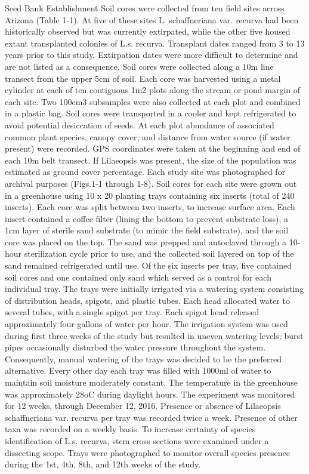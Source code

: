 \documentclass[multicol]{elsarticle}
\begin{document}
\begin{multicols}{2}
\begin{subsection}{Seed Bank Establishment}
Soil cores were collected from ten field sites across Arizona (Table 1-1). At five of these sites L. schaffneriana var. recurva had been historically observed but was currently extirpated, while the other five housed extant transplanted colonies of L.s. recurva. Transplant dates ranged from 3 to 13 years prior to this study. Extirpation dates were more difficult to determine and are not listed as a consequence. Soil cores were collected along a 10m line transect from the upper 5cm of soil. Each core was harvested using a metal cylinder at each of ten contiguous 1m2 plots along the stream or pond margin of each site. Two 100cm3 subsamples were also collected at each plot and combined in a plastic bag. Soil cores were transported in a cooler and kept refrigerated to avoid potential desiccation of seeds. At each plot abundance of associated common plant species, canopy cover, and distance from water source (if water present) were recorded. GPS coordinates were taken at the beginning and end of each 10m belt transect. If Lilaeopsis was present, the size of the population was estimated as ground cover percentage. Each study site was photographed for archival purposes (Figs.1-1 through 1-8). Soil cores for each site were grown out in a greenhouse using 10 x 20 planting trays containing six inserts (total of 240 inserts). Each core was split between two inserts, to increase surface area. Each insert contained a coffee filter (lining the bottom to prevent substrate loss), a 1cm layer of sterile sand substrate (to mimic the field substrate), and the soil core was placed on the top. The sand was prepped and autoclaved through a 10-hour sterilization cycle prior to use, and the collected soil layered on top of the sand remained refrigerated until use. Of the six inserts per tray, five contained soil cores and one contained only sand which served as a control for each individual tray. The trays were initially irrigated via a watering system consisting of distribution heads, spigots, and plastic tubes. Each head allocated water to several tubes, with a single spigot per tray. Each spigot head released approximately four gallons of water per hour. The irrigation system was used during first three weeks of the study but resulted in uneven watering levels; burst pipes occasionally disturbed the water pressure throughout the system. Consequently, manual watering of the trays was decided to be the preferred alternative. Every other day each tray was filled with 1000ml of water to maintain soil moisture moderately constant. The temperature in the greenhouse was approximately 28oC during daylight hours. The experiment was monitored for 12 weeks, through December 12, 2016.  Presence or absence of Lilaeopsis schaffneriana var. recurva per tray was recorded twice a week. Presence of other taxa was recorded on a weekly basis. To increase certainty of species identification of L.s. recurva, stem cross sections were examined under a dissecting scope. Trays were photographed to monitor overall species presence during the 1st, 4th, 8th, and 12th weeks of the study.
\end{subsection}


\end{multicols}
\end{document}
